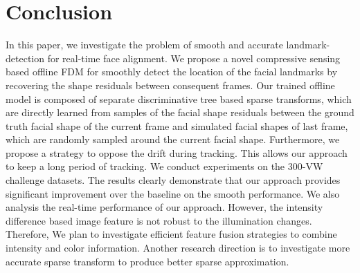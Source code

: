 \documentclass[a4paper, 10pt, conference]{ieeeconf}      %
\begin{document}
\section{Conclusion}
In this paper, we investigate the problem of smooth and accurate landmark-detection for real-time face alignment. We propose a novel compressive 
sensing based offline FDM for smoothly detect the location of the facial landmarks by recovering the shape residuals between consequent frames. 
Our trained offline model is composed of separate discriminative tree based sparse transforms, which are directly learned from samples of the 
facial shape residuals between the ground truth facial shape of the current frame and simulated facial shapes of last frame, which are randomly 
sampled around the current facial shape. Furthermore, we propose a strategy to oppose the drift during tracking. This allows our approach to keep 
a long period of tracking. We conduct experiments on the 300-VW challenge datasets. The results clearly demonstrate that our approach provides 
significant improvement over the baseline on the smooth performance.
We also analysis the real-time performance of our approach. 
However, the intensity difference based image feature is 
not robust to the illumination changes.
Therefore, We plan to investigate efficient feature fusion strategies to combine intensity and color information.
Another research direction is to investigate more accurate sparse transform to produce better sparse approximation.

\end{document}
